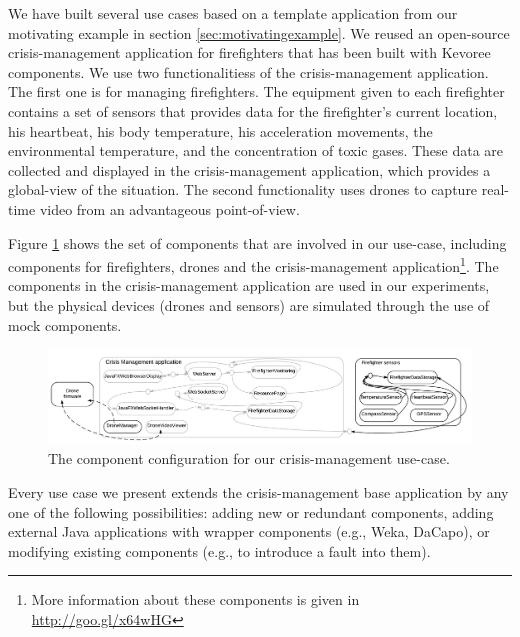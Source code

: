 We have built several use cases based on a template application from our motivating example in section \ref{sec:motivatingexample}.
We reused an open-source crisis-management application for firefighters that has been built with Kevoree components.
We use two functionalitiess of the crisis-management application.
The first one is for managing firefighters.
The equipment given to each firefighter contains a set of sensors that provides data for the firefighter's current location, his heartbeat, his body temperature, his acceleration movements, the environmental temperature, and the concentration of toxic gases. 
These data are collected and displayed in the crisis-management application, which provides a global-view of the situation. 
The second functionality uses drones to capture real-time video from an advantageous point-of-view.

Figure \ref{fig:complete-usecase} shows the set of components that are involved in our use-case, including components for firefighters, drones and the crisis-management application\footnote{More information about these components is given in \url{http://goo.gl/x64wHG}}. The components in the crisis-management application are used in our experiments, but the physical devices (drones and sensors) are simulated through the use of mock components.

\begin{figure}[!bt]
	\centering
	\includegraphics[scale=0.4]{chapter5/figures/complete-usecase-new}
	\caption{\label{fig:complete-usecase}The component configuration for our crisis-management use-case.}
\end{figure}

Every use case we present extends the crisis-management base application by any one of the following possibilities: adding new or redundant components, adding external Java applications with wrapper components (e.g., Weka, DaCapo), or modifying existing components (e.g., to introduce a fault into them).

